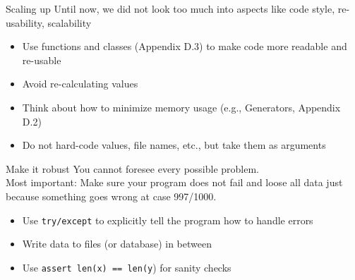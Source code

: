 \documentclass{beamer}
\begin{document}
\begin{frame}{Scaling up}
	Until now, we did not look too much into aspects like code style, re-usability, scalability
	\begin{itemize}
		\item Use functions and classes (Appendix D.3) to make code more readable and re-usable
		\item Avoid re-calculating values
		\item Think about how to minimize memory usage (e.g., Generators, Appendix D.2)
		\item Do not hard-code values, file names, etc., but take them as arguments
	\end{itemize}	
\end{frame}




\begin{frame}{Make it robust}
You cannot foresee every possible problem.\\
Most important: Make sure your program does not fail and loose all data just because something goes wrong at case 997/1000.
	\begin{itemize}
		\item Use \texttt{try/except} to explicitly tell the program how to handle errors
		\item Write data to files (or database) in between
		\item Use \texttt{assert len(x) == len(y}) for sanity checks
	\end{itemize}	
\end{frame}


%
%






\end{document}
